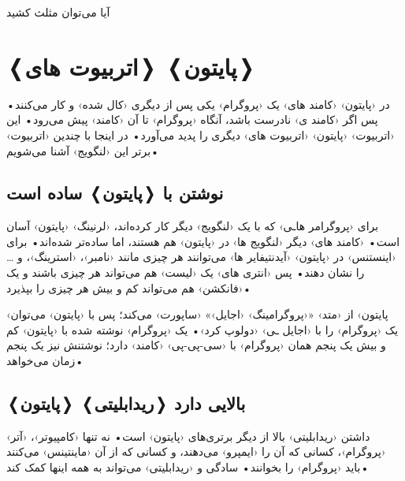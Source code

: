 \documentclass[openany, twocolumn]{book}
\begin{document}
\begin{Flowchart*}

\caption{آیا می‌توان مثلث کشید\label{R10}}
\end{Flowchart*}

\chapter{❬اتربیوت های❭ ❬پایتون❭}
در ‹پایتون› ‹کامند های› یک ‹پروگرام› یکی پس از دیگری ‹کال شده› و کار می‌کنند• پس اگر ‹کامند ی› نا‌درست باشد، آنگاه ‹پروگرام› تا آن ‹کامند› پیش می‌رود• این ‹اتربیوت› ‹پایتون› ‹اتربیوت های› دیگری را پدید می‌آورد• در اینجا با چندین ‹اتربیوت› برتر این ‹لنگویج› آشنا می‌شویم•

\section{نوشتن با ❬پایتون❭ ساده است}
برای ‹پروگرامر هاـی› که با یک ‹لنگویج› دیگر کار کرده‌اند، ‹لرنینگ› ‹پایتون› آسان است• ‹کامند های› دیگر ‹لنگویج ها› در ‹پایتون› هم هستند، اما ساده‌تر شده‌اند• برای ‹اینستنس› در ‹پایتون› ‹آیدنتیفایر ها› می‌توانند هر چیزی مانند ‹نامبر›، ‹استرینگ›، و \ldots{} را نشان دهند• پس ‹انتری های› یک ‹لیست› هم می‌تواند هر چیزی باشند و یک ‹فانکشن› هم می‌تواند کم و بیش هر چیزی را بپذیرد•

‹پایتون› از ‹متد› «‹پروگرامینگ› ‹اجایل›» ‹ساپورت› می‌کند؛ پس با ‹پایتون› می‌توان یک ‹پروگرام› را با ‹اجایل ـی› ‹دولوپ کرد›• یک ‹پروگرام› نوشته شده با ‹پایتون› کم و بیش یک پنجم همان ‹پروگرام› با ‹سی-پی-پی› ‹کامند› دارد؛ نوشتنش نیز یک پنجم زمان می‌خواهد•

\section{❬پایتون❭ ❬ریدابلیتی❭ بالایی دارد}
داشتن ‹ریدابلیتی› بالا از دیگر برتری‌های ‹پایتون› است• نه تنها ‹کامپیوتر›، ‹آتر› ‹پروگرام›، کسانی که آن را ‹ایمپرو› می‌دهند، و کسانی که از آن ‹ماینتینس› می‌کنند باید ‹پروگرام› را بخوانند• سادگی و ‹ریدابلیتی› می‌تواند به همه اینها کمک کند•
\end{document}
